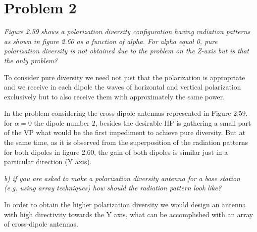 \section{Problem 2}
\textit{Figure 2.59 shows a polarization diversity configuration having radiation patterns as shown in figure 2.60 as a function of alpha. For alpha equal 0, pure polarization diversity is not obtained due to the problem on the Z-axis but is that the only problem?} 

To consider pure diversity we need not just that the polarization is appropriate and we receive in each dipole the waves of horizontal and vertical polarization exclusively but to also receive them with approximately the same power.

In the problem considering the cross-dipole antennas represented in Figure 2.59, for $\alpha=0$ the dipole number 2, besides the desirable HP is gathering a small part of the VP what would be the first impediment to achieve pure diversity. But at the same time, as it is observed from the superposition of the radiation patterns for both dipoles in figure 2.60, the gain of both dipoles is similar just in a particular direction (Y axis). 

\textit{b) if you are asked to make a polarization diversity antenna for a base station (e.g. using array techniques) how should the radiation pattern look like?}

In order to obtain the higher polarization diversity we would design an antenna with high directivity towards the Y axis, what can be accomplished with an array of cross-dipole antennas.